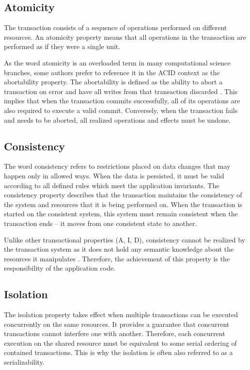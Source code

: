 \documentclass[oneside,
  digital, %
  table,   %
  lof,     %
  lot,     %
]{fithesis3}
\begin{document}
\subsection{Atomicity}

The transaction consists of a sequence of operations performed on different resources. An atomicity property means that all operations in the transaction are performed as if they were a single unit. 

As the word atomicity is an overloaded term in many computational science branches, some authors prefer to reference it in the ACID context as the abortability property. The abortability is defined as  the ability to abort a transaction on error and have all writes from that transaction discarded \cite{design_data_intens_apps}. This implies that when the transaction commits successfully, all of its operations are also required to execute a valid commit. Conversely, when the transaction fails and needs to be aborted, all realized operations and effects must be undone.

\subsection{Consistency}

The word consistency refers to restrictions placed on data changes that may happen only in allowed ways. When the data is persisted, it must be valid according to all defined rules which meet the application invariants. The consistency property describes that the transaction maintains the consistency of the system and resources that it is being performed on. When the transaction is started on the consistent system, this system must remain consistent when the transaction ends -- it moves from one consistent state to another.

Unlike other transactional properties (A, I, D), consistency cannot be realized by the transaction system as it does not hold any semantic knowledge about the resources it manipulates \cite{java_tran_processing}. Therefore, the achievement of this property is the responsibility of the application code.

\subsection{Isolation}

The isolation property takes effect when multiple transactions can be executed concurrently on the same resources. It provides a guarantee that concurrent transactions cannot interfere one with another. Therefore, each concurrent execution on the shared resource must be equivalent to some serial ordering of contained transactions. This is why the isolation is often also referred to as a serializability.
\end{document}
